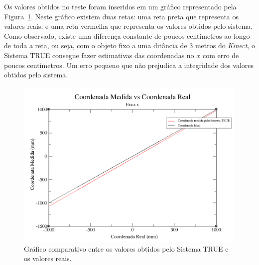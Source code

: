 	Os valores obtidos no teste foram inseridos em um gráfico representado pela Figura~\ref{fig:grafico-eixox}. Neste gráfico existem duas retas: uma reta preta que representa os valores reais; e uma reta vermelha que representa os valores obtidos pelo sistema. Como observado, existe uma diferença constante de poucos centímetros ao longo de toda a reta, ou seja, com o objeto fixo a uma ditância de 3 metros do \textit{Kinect}, o Sistema TRUE consegue fazer estimativas das coordenadas no $\displaystyle x$ com erro de poucos centímetros. Um erro pequeno que não prejudica a integridade dos valores obtidos pelo sistema.

	\begin{figure}[htb]
		\begin{center}
			\includegraphics[scale=0.4]{figuras/5.Testes/grafico-eixo-x.png}
		\end{center}
		\caption{Gráfico comparativo entre os valores obtidos pelo Sistema TRUE e os valores reais.}
		\label{fig:grafico-eixox}
	\end{figure}

































